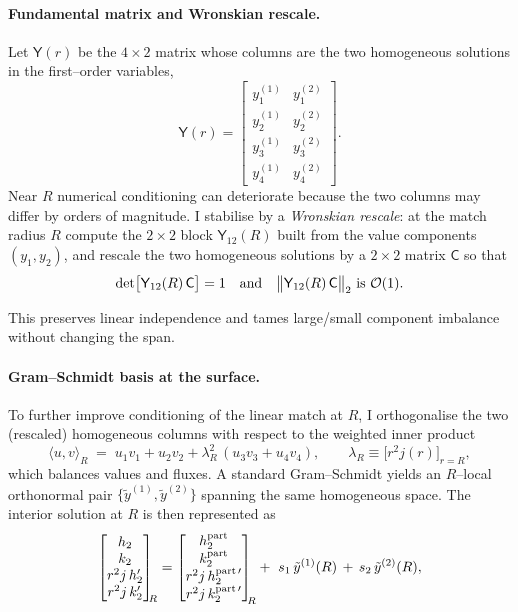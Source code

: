 \documentclass{iopjournal}
\begin{document}
\paragraph{Fundamental matrix and Wronskian rescale.}
Let $\mathsf Y(r)$ be the $4\times2$ matrix whose columns are the two homogeneous solutions in the first–order variables,
\[
\mathsf Y(r)=
\begin{bmatrix}
y_1^{(1)} & y_1^{(2)}\\
y_2^{(1)} & y_2^{(2)}\\
y_3^{(1)} & y_3^{(2)}\\
y_4^{(1)} & y_4^{(2)}
\end{bmatrix}.
\]
Near $R$ numerical conditioning can deteriorate because the two columns may differ by orders of magnitude. I stabilise by a \emph{Wronskian rescale}: at the match radius $R$ compute the $2\times2$ block $\mathsf Y_{12}(R)$ built from the value components $(y_1,y_2)$, and rescale the two homogeneous solutions by a $2\times2$ matrix $\mathsf C$ so that
\begin{equation}
\det\!\big[\mathsf Y_{12}(R)\,\mathsf C\big]=1
\quad\text{and}\quad
\bigl\lVert \mathsf Y_{12}(R)\,\mathsf C \bigr\rVert_{2}\ \text{is }\order{1}.
\label{eq:I2_wronskian_rescale}
\end{equation}

This preserves linear independence and tames large/small component imbalance without changing the span.

\paragraph{Gram–Schmidt basis at the surface.}
To further improve conditioning of the linear match at $R$, I orthogonalise the two (rescaled) homogeneous columns with respect to the weighted inner product
\begin{equation}
\langle u,v\rangle_R\;=\;u_1 v_1+u_2 v_2+\lambda_R^2\,(u_3 v_3+u_4 v_4),
\qquad \lambda_R\equiv \big[r^{2}j(r)\big]_{r=R},
\label{eq:I2_weighted_IP}
\end{equation}
which balances values and fluxes. A standard Gram–Schmidt yields an $R$–local orthonormal pair $\{\tilde y^{(1)},\tilde y^{(2)}\}$ spanning the same homogeneous space. The interior solution at $R$ is then represented as
\begin{equation}
\begin{bmatrix}h_2\\ k_2\\ r^{2}j\,h_2'\\ r^{2}j\,k_2'\end{bmatrix}_{\!\!R}
=
\begin{bmatrix}h_2^{\rm part}\\ k_2^{\rm part}\\ r^{2}j\,h_2^{\rm part\,\prime}\\ r^{2}j\,k_2^{\rm part\,\prime}\end{bmatrix}_{\!\!R}
+\ s_1\,\tilde y^{(1)}(R)\,+\,s_2\,\tilde y^{(2)}(R),
\label{eq:I2_surface_rep}
\end{equation}
\end{document}
